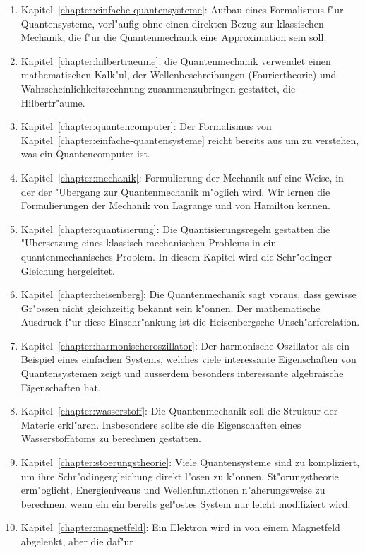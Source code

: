 \begin{enumerate}
\item Kapitel~\ref{chapter:einfache-quantensysteme}:
Aufbau eines Formalismus f"ur Quantensysteme, vorl"aufig ohne einen
direkten Bezug zur klassischen Mechanik, die f"ur die Quantenmechanik
eine Approximation sein soll.
\item Kapitel~\ref{chapter:hilbertraeume}:
die Quantenmechanik verwendet
einen mathematischen Kalk"ul, der Wellenbeschreibungen (Fouriertheorie)
und Wahrscheinlichkeitsrechnung zusammenzubringen gestattet, die Hilbertr"aume.
\item Kapitel~\ref{chapter:quantencomputer}: 
Der Formalismus von Kapitel~\ref{chapter:einfache-quantensysteme}
reicht bereits aus um zu verstehen, was ein Quantencomputer ist.
\item Kapitel~\ref{chapter:mechanik}:
Formulierung der Mechanik auf 
eine Weise, in der der "Ubergang zur Quantenmechanik m"oglich wird.
Wir lernen die Formulierungen der Mechanik von Lagrange und von Hamilton
kennen.
\item Kapitel~\ref{chapter:quantisierung}:
Die Quantisierungsregeln
gestatten die "Ubersetzung eines klassisch mechanischen Problems in 
ein quantenmechanisches Problem. In diesem Kapitel wird die
Schr"odinger-Gleichung hergeleitet.
\item Kapitel~\ref{chapter:heisenberg}:
Die Quantenmechanik sagt voraus, dass gewisse Gr"ossen nicht gleichzeitig
bekannt sein k"onnen. 
Der mathematische Ausdruck f"ur diese Einschr"ankung ist die 
Heisenbergsche Unsch"arferelation.
\item Kapitel~\ref{chapter:harmonischeroszillator}:
Der harmonische
Oszillator als ein Beispiel eines einfachen Systems, welches
viele interessante Eigenschaften von Quantensystemen zeigt und 
ausserdem besonders interessante algebraische Eigenschaften hat.
\item Kapitel~\ref{chapter:wasserstoff}:
Die Quantenmechanik soll
die Struktur der Materie erkl"aren. Insbesondere sollte sie 
die Eigenschaften eines Wasserstoffatoms zu berechnen gestatten.
\item Kapitel~\ref{chapter:stoerungstheorie}:
Viele Quantensysteme sind zu kompliziert, um ihre Schr"odingergleichung
direkt l"osen zu k"onnen.
St"orungstheorie erm"oglicht, Energieniveaus und Wellenfunktionen
n"aherungsweise zu berechnen, wenn ein ein bereits gel"ostes System
nur leicht modifiziert wird.
\item Kapitel~\ref{chapter:magnetfeld}:
Ein Elektron wird in von einem Magnetfeld abgelenkt, aber die daf"ur

\end{enumerate}
